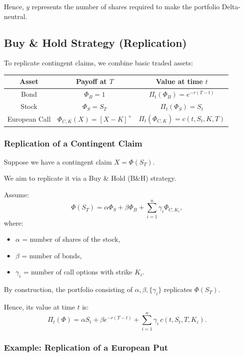 \documentclass[12pt,a4paper]{article}
\theoremstyle{definition}
\begin{document}
Hence, $y$ represents the number of shares required to make the portfolio Delta-neutral.

\subsection{Buy \& Hold Strategy (Replication)}

To replicate contingent claims, we combine basic traded assets:

\begin{center}
\begin{tabular}{|c|c|c|}
\hline
\textbf{Asset} & \textbf{Payoff at $T$} & \textbf{Value at time $t$} \\
\hline
Bond & $\Phi_B = 1$ & $\Pi_t(\Phi_B) = e^{-r(T-t)}$ \\
\hline
Stock & $\Phi_S = S_T$ & $\Pi_t(\Phi_S) = S_t$ \\
\hline
European Call & $\Phi_{C,K}(X) = [X - K]^+$ & $\Pi_t(\Phi_{C,K}) = c(t, S_t, K, T)$ \\
\hline
\end{tabular}
\end{center}

\subsubsection{Replication of a Contingent Claim}

Suppose we have a contingent claim $X = \Phi(S_T)$.

We aim to replicate it via a Buy \& Hold (B\&H) strategy.

Assume:
\[
\Phi(S_T) = \alpha\Phi_S + \beta\Phi_B + \sum_{i=1}^n \gamma_i \Phi_{C,K_i},
\]
where:
\begin{itemize}
\item $\alpha$ = number of shares of the stock,
\item $\beta$ = number of bonds,
\item $\gamma_i$ = number of call options with strike $K_i$.
\end{itemize}

By construction, the portfolio consisting of $\alpha, \beta, \{\gamma_i\}$ replicates $\Phi(S_T)$.

Hence, its value at time $t$ is:
\[
\Pi_t(\Phi) = \alpha S_t + \beta e^{-r(T-t)} + \sum_{i=1}^n \gamma_i \, c(t, S_t, T, K_i).
\]

\subsubsection{Example: Replication of a European Put}
\end{document}

